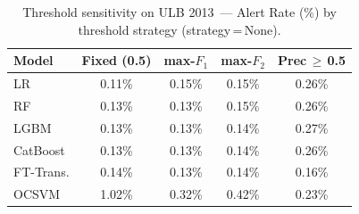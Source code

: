 \begin{table}[ht!]
\centering
\caption{Threshold sensitivity on ULB 2013~--- Alert Rate (\%) by threshold strategy (strategy\,=\,None).}
\label{tab:threshold_ulb_alert}
\begin{tabular}{l c c c c}
\toprule
Model & Fixed (0.5) & max-$F_1$ & max-$F_2$ & Prec\,$\geq$\,0.5 \\
\midrule
LR         & 0.11\% & 0.15\% & 0.15\% & 0.26\% \\
RF         & 0.13\% & 0.13\% & 0.15\% & 0.26\% \\
LGBM       & 0.13\% & 0.13\% & 0.14\% & 0.27\% \\
CatBoost   & 0.13\% & 0.13\% & 0.14\% & 0.26\% \\
FT-Trans.  & 0.14\% & 0.13\% & 0.14\% & 0.16\% \\
OCSVM      & 1.02\% & 0.32\% & 0.42\% & 0.23\% \\
\bottomrule
\end{tabular}
\end{table}